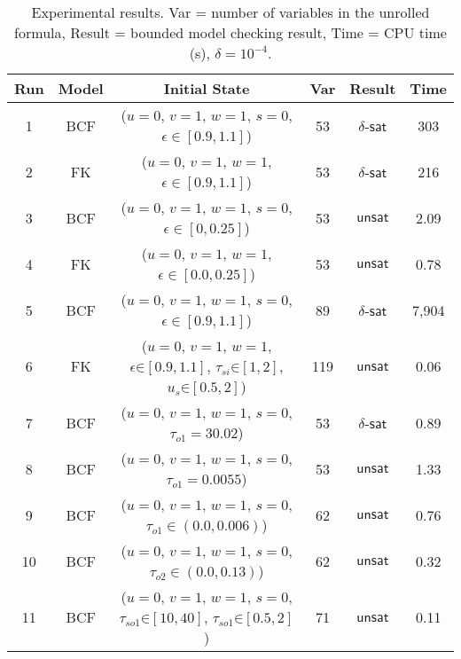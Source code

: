 {\small
\begin{table}[!th]
  \centering
  \small
  \begin{tabular}{c|c|c|c|c|c}
    \hline
    \hline
    Run & Model   & Initial State  & Var  & Result   & Time   \\
    \hline
    \hline
    1 & BCF & ($u = 0$, $v = 1$, $w = 1$, $s = 0$, $\epsilon \in [0.9,1.1]$) & 53  & $\delta$-$\mathsf{sat}$  & 303 \\
    2 & FK & ($u = 0$, $v = 1$, $w = 1$, $\epsilon \in [0.9,1.1]$)  & 53 & $\delta$-$\mathsf{sat}$ & 216 \\
    3 & BCF & ($u = 0$, $v = 1$, $w = 1$, $s = 0$, $\epsilon \in [0,0.25]$) & 53  & $\mathsf{unsat}$  & 2.09 \\
    4 & FK & ($u = 0$, $v = 1$, $w = 1$, $\epsilon \in [0.0,0.25]$)  & 53 & $\mathsf{unsat}$ & 0.78 \\
    5 & BCF & ($u = 0$, $v = 1$, $w = 1$, $s = 0$, $\epsilon \in [0.9,1.1]$)  & 89  & $\delta$-$\mathsf{sat}$  & 7,904 \\
    6 & FK & ($u = 0$, $v = 1$, $w = 1$, $\epsilon \mathord{\in} [0.9,1.1]$, $\tau_{si} \mathord{\in} [1,2]$, $u_{s} \mathord{\in} [0.5,2]$)  & 119 & $\mathsf{unsat}$ & 0.06 \\   
    7 & BCF & ($u = 0$, $v = 1$, $w = 1$, $s = 0$, $\tau_{o1} = 30.02$) & 53  & $\delta$-$\mathsf{sat}$  & 0.89 \\        
    8 & BCF & ($u = 0$, $v = 1$, $w = 1$, $s = 0$, $\tau_{o1} = 0.0055$) & 53  & $\mathsf{unsat}$  & 1.33 \\        
    9 & BCF & ($u = 0$, $v = 1$, $w = 1$, $s = 0$, $\tau_{o1} \in (0.0, 0.006)$) & 62  & $\mathsf{unsat}$  & 0.76 \\        
    10 & BCF & ($u = 0$, $v = 1$, $w = 1$, $s = 0$, $\tau_{o2} \in (0.0, 0.13)$)  & 62  & $\mathsf{unsat}$  & 0.32 \\     
    11 & BCF & ($u = 0$, $v = 1$, $w = 1$, $s = 0$, $\tau_{so1} \mathord{\in} [10, 40]$, $\tau_{so1}\mathord{\in} [0.5, 2]$) & 71  & $\mathsf{unsat}$  & 0.11 \\   
    \hline
    \hline
  \end{tabular}
  \caption{\small Experimental results.
    Var = number of variables in the unrolled formula,
    Result = bounded model checking result,
    Time = CPU time (s),
    $\delta=10^{-4}$.
}\label{tbl:exp}
\end{table}
}

